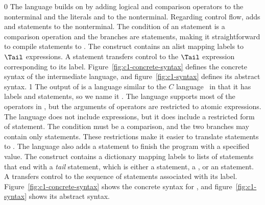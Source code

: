 \documentclass[7x10]{TimesAPriori_MIT}%
\def\racketEd{0}
\def\pythonEd{1}
\def\edition{1}
\newcommand{\pythonColor}[0]{}
\numberwithin{theorem}{chapter}
\numberwithin{definition}{chapter}
\numberwithin{equation}{chapter}
\begin{document}
{\if\edition\racketEd
%
The \LangCIf{} language builds on \LangCVar{} by adding logical and
comparison operators to the \Exp{} nonterminal and the literals
\TRUE{} and \FALSE{} to the \Arg{} nonterminal.  Regarding control
flow, \LangCIf{} adds  and  statements to the
\Tail{} nonterminal. The condition of an  statement is a
comparison operation and the branches are  statements,
making it straightforward to compile  statements to {\ArchName}.  The
 construct contains an alist mapping labels to $\Tail$
expressions. A  statement transfers control to the $\Tail$
expression corresponding to its label.
%
Figure~\ref{fig:c1-concrete-syntax} defines the concrete syntax of the
\LangCIf{} intermediate language, and figure~\ref{fig:c1-syntax}
defines its abstract syntax.
%
\fi}
%
{\if\edition\pythonEd\pythonColor
%
The output of  is a language similar to the
$C$ language~\citep{Kernighan:1988nx} in that it has labels and
 statements, so we name it \LangCIf{}.  
%
The \LangCIf{} language supports most of the operators in \LangIf{}, but
the arguments of operators are restricted to atomic expressions. The
\LangCIf{} language does not include  expressions, but it does
include a restricted form of  statement. The condition must be
a comparison, and the two branches may contain only 
statements. These restrictions make it easier to translate 
statements to {\ArchName}.  The \LangCIf{} language also adds a 
statement to finish the program with a specified value.
%
The  construct contains a dictionary mapping labels to
lists of statements that end with a \emph{tail} statement, which is
either a  statement, a , or an
 statement.
%
A  transfers control to the sequence of statements
associated with its label.
%
Figure~\ref{fig:c1-concrete-syntax} shows the concrete syntax for \LangCIf{},
and figure~\ref{fig:c1-syntax} shows its
abstract syntax.
%
\fi}
%

\newcommand{\CifGrammarRacket}{
\begin{array}{lcl}
\Atm &::=& \itm{bool} \\
\itm{cmp} &::= & \code{eq?} \MID \code{<} \MID \code{<=} \MID \code{>} \MID \code{>=} \\
\Exp &::=& \CNOT{\Atm} \MID \LP \itm{cmp}~\Atm~\Atm\RP \\
\Tail &::= & \key{goto}~\itm{label}\key{;}\\
   &\MID& \key{if}~\LP \itm{cmp}~\Atm~\Atm \RP~ \key{goto}~\itm{label}\key{;} ~\key{else}~\key{goto}~\itm{label}\key{;} 
\end{array}
}
\end{document}
